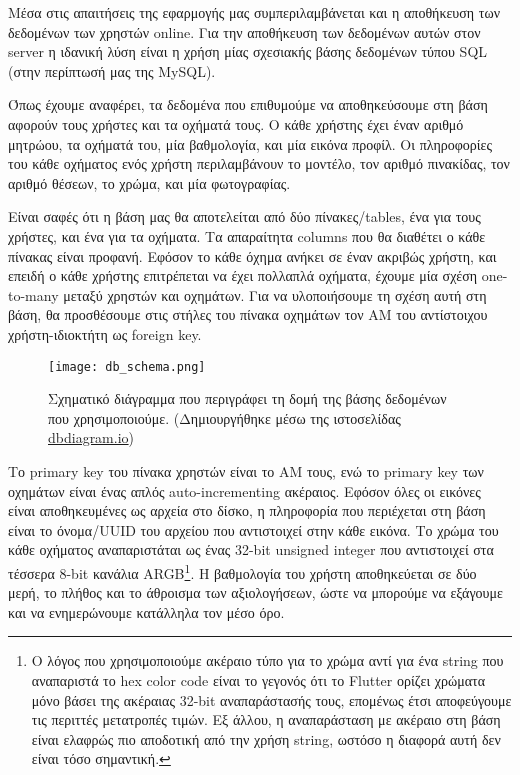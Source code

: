 \documentclass[../thesis.tex]{subfiles}
\begin{document}
Μέσα στις απαιτήσεις της εφαρμογής μας συμπεριλαμβάνεται και η αποθήκευση των δεδομένων των χρηστών online.
Για την αποθήκευση των δεδομένων αυτών στον server η ιδανική λύση είναι η χρήση μίας σχεσιακής βάσης δεδομένων τύπου SQL (στην περίπτωσή μας της MySQL). 

Όπως έχουμε αναφέρει, τα δεδομένα που επιθυμούμε να αποθηκεύσουμε στη βάση αφορούν τους χρήστες και τα οχήματά τους.
Ο κάθε χρήστης έχει έναν αριθμό μητρώου, τα οχήματά του, μία βαθμολογία, και μία εικόνα προφίλ.
Οι πληροφορίες του κάθε οχήματος ενός χρήστη περιλαμβάνουν το μοντέλο, τον αριθμό πινακίδας, τον αριθμό θέσεων, το χρώμα, και μία φωτογραφίας.

Είναι σαφές ότι η βάση μας θα αποτελείται από δύο πίνακες/tables, ένα για τους χρήστες, και ένα για τα οχήματα.
Τα απαραίτητα columns που θα διαθέτει ο κάθε πίνακας είναι προφανή.
Εφόσον το κάθε όχημα ανήκει σε έναν ακριβώς χρήστη, και επειδή ο κάθε χρήστης επιτρέπεται να έχει πολλαπλά οχήματα, έχουμε μία σχέση one-to-many μεταξύ χρηστών και οχημάτων.
Για να υλοποιήσουμε τη σχέση αυτή στη βάση, θα προσθέσουμε στις στήλες του πίνακα οχημάτων τον ΑΜ του αντίστοιχου χρήστη-ιδιοκτήτη ως foreign key.

\begin{figure}
    \texttt{[image: db\_schema.png]}
    \centering
    \caption{Σχηματικό διάγραμμα που περιγράφει τη δομή της βάσης δεδομένων που χρησιμοποιούμε. (Δημιουργήθηκε μέσω της ιστοσελίδας \url{dbdiagram.io})}
\end{figure}

Το primary key του πίνακα χρηστών είναι το ΑΜ τους, ενώ το primary key των οχημάτων είναι ένας απλός auto-incrementing ακέραιος.
Εφόσον όλες οι εικόνες είναι αποθηκευμένες ως αρχεία στο δίσκο, η πληροφορία που περιέχεται στη βάση είναι το όνομα/UUID του αρχείου που αντιστοιχεί στην κάθε εικόνα.
Το χρώμα του κάθε οχήματος αναπαριστάται ως ένας 32-bit unsigned integer που αντιστοιχεί στα τέσσερα 8-bit κανάλια ARGB\footnote{Ο λόγος που χρησιμοποιούμε ακέραιο τύπο για το χρώμα αντί για ένα string που αναπαριστά το hex color code είναι το γεγονός ότι το Flutter ορίζει χρώματα μόνο βάσει της ακέραιας 32-bit αναπαράστασής τους, επομένως έτσι αποφεύγουμε τις περιττές μετατροπές τιμών. Εξ άλλου, η αναπαράσταση με ακέραιο στη βάση είναι ελαφρώς πιο αποδοτική από την χρήση string, ωστόσο η διαφορά αυτή δεν είναι τόσο σημαντική.}.
Η βαθμολογία του χρήστη αποθηκεύεται σε δύο μερή, το πλήθος και το άθροισμα των αξιολογήσεων, ώστε να μπορούμε να εξάγουμε και να ενημερώνουμε κατάλληλα τον μέσο όρο.
\end{document}
